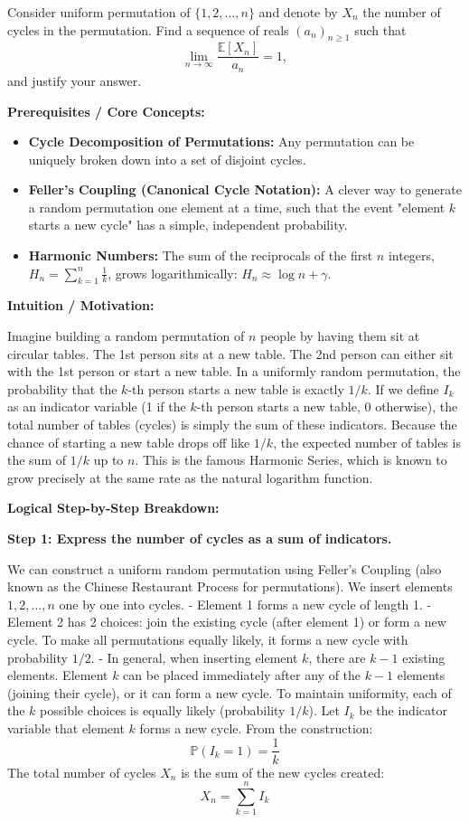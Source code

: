 \begin{exercise}\label{probability:2019:7}
Consider uniform permutation of $\{1,2,\ldots,n\}$ and denote by $X_n$ the number of cycles in the permutation. Find a sequence of reals $(a_n)_{n \geq 1}$ such that
\[
\lim_{n \to \infty} \frac{\mathbb{E}[X_n]}{a_n} = 1,
\]
and justify your answer.
\end{exercise}

\begin{solution}
\textbf{Prerequisites / Core Concepts:}
\begin{itemize}
    \item \textbf{Cycle Decomposition of Permutations:} Any permutation can be uniquely broken down into a set of disjoint cycles.
    \item \textbf{Feller's Coupling (Canonical Cycle Notation):} A clever way to generate a random permutation one element at a time, such that the event "element $k$ starts a new cycle" has a simple, independent probability.
    \item \textbf{Harmonic Numbers:} The sum of the reciprocals of the first $n$ integers, $H_n = \sum_{k=1}^n \frac{1}{k}$, grows logarithmically: $H_n \approx \log n + \gamma$.
\end{itemize}

\textbf{Intuition / Motivation:}

Imagine building a random permutation of $n$ people by having them sit at circular tables. The 1st person sits at a new table. The 2nd person can either sit with the 1st person or start a new table. In a uniformly random permutation, the probability that the $k$-th person starts a new table is exactly $1/k$.
If we define $I_k$ as an indicator variable (1 if the $k$-th person starts a new table, 0 otherwise), the total number of tables (cycles) is simply the sum of these indicators.
Because the chance of starting a new table drops off like $1/k$, the expected number of tables is the sum of $1/k$ up to $n$. This is the famous Harmonic Series, which is known to grow precisely at the same rate as the natural logarithm function.

\textbf{Logical Step-by-Step Breakdown:}

\textbf{Step 1: Express the number of cycles as a sum of indicators.}

We can construct a uniform random permutation using Feller's Coupling (also known as the Chinese Restaurant Process for permutations).
We insert elements $1, 2, \dots, n$ one by one into cycles.
- Element 1 forms a new cycle of length 1.
- Element 2 has 2 choices: join the existing cycle (after element 1) or form a new cycle. To make all permutations equally likely, it forms a new cycle with probability $1/2$.
- In general, when inserting element $k$, there are $k-1$ existing elements. Element $k$ can be placed immediately after any of the $k-1$ elements (joining their cycle), or it can form a new cycle. To maintain uniformity, each of the $k$ possible choices is equally likely (probability $1/k$).
Let $I_k$ be the indicator variable that element $k$ forms a new cycle. From the construction:
\[ \mathbb{P}(I_k = 1) = \frac{1}{k} \]
The total number of cycles $X_n$ is the sum of the new cycles created:
\[ X_n = \sum_{k=1}^n I_k \]


\end{solution}
